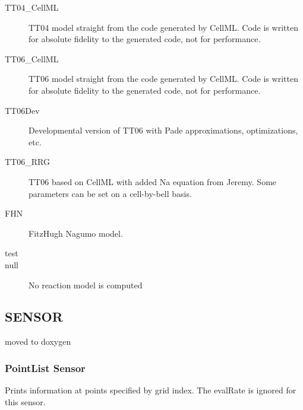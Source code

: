 \documentclass{article}
\begin{document}
\begin{description}
  \item[TT04\_CellML] TT04 model straight from the code generated by
    CellML.  Code is written for absolute fidelity to the generated
    code, not for performance.
  \item[TT06\_CellML] TT06 model straight from the code generated by
    CellML.  Code is written for absolute fidelity to the generated
    code, not for performance.
  \item[TT06Dev] Developmental version of TT06 with Pade approximations,
    optimizations, etc.
  \item[TT06\_RRG] TT06 based on CellML with added Na equation from
    Jeremy.  Some parameters can be set on a cell-by-bell basis.
  \item[FHN] FitzHugh Nagumo model.
  \item[test] 
  \item[null] No reaction model is computed
\end{description}



\begin{keywords}
\end{keywords}


\subsection{SENSOR}

moved to doxygen


\subsubsection{PointList Sensor}
Prints information at points specified by grid index.  The evalRate is
ignored for this sensor.
\begin{keywords}
  
\end{keywords}
\end{document}
